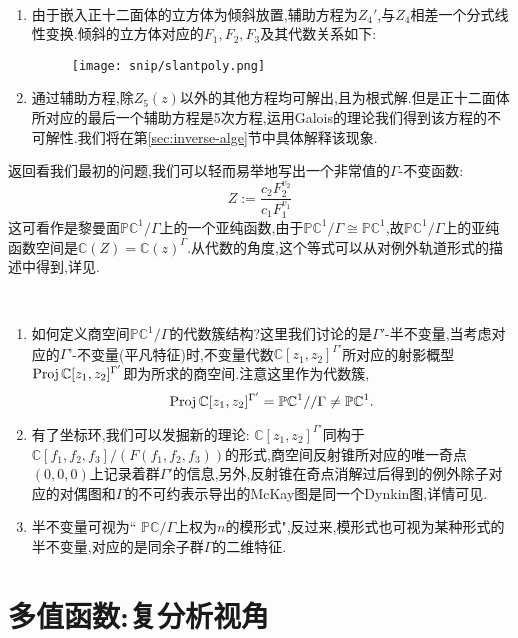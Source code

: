 \begin{remarks}\
	\begin{enumerate}[1.]
		\item 由于嵌入正十二面体的立方体为倾斜放置,辅助方程为$Z_4'$,与$Z_4$相差一个分式线性变换.倾斜的立方体对应的$F_1,F_2,F_3$及其代数关系如下:
	\begin{figure}[ht]
	\centering
	\texttt{[image: snip/slantpoly.png]}
\end{figure}
		\item 通过辅助方程,除$Z_5(z)$以外的其他方程均可解出,且为根式解.但是正十二面体所对应的最后一个辅助方程是5次方程,运用Galois的理论我们得到该方程的不可解性.我们将在第\ref{sec:inverse-alge}节中具体解释该现象.
	\end{enumerate}
\end{remarks}
返回看我们最初的问题,我们可以轻而易举地写出一个非常值的$\Gamma$-不变函数:
$$Z:= \frac{c_2F_2^{v_2}}{c_1F_1^{v_1}}$$
这可看作是黎曼面$\mathbb{PC}^1/\Gamma$上的一个亚纯函数,由于$\mathbb{PC}^1/\Gamma \cong \mathbb{PC}^1$,故$\mathbb{PC}^1/\Gamma$上的亚纯函数空间是$\mathbb{C}(Z) = \mathbb{C}(z)^{\Gamma}$.从代数的角度,这个等式可以从对例外轨道形式的描述中得到,详见\cite[3.5,3.6]{shurman1997geometry}.
\begin{remarks}\
	\begin{enumerate}
		\item 如何定义商空间$\mathbb{PC}^1/\Gamma$的代数簇结构?这里我们讨论的是$\Gamma'$-半不变量,当考虑对应的$\Gamma’$-不变量(平凡特征)时,不变量代数$\mathbb{C}[z_1,z_2]^{\Gamma'}$所对应的射影概型$\operatorname{\operatorname{Proj}}\mathbb{C}[z_1,z_2]^{\Gamma'}$即为所求的商空间.注意这里作为代数簇, $$\operatorname{\operatorname{Proj}}\mathbb{C}[z_1,z_2]^{\Gamma'} = \mathbb{PC}^1//\Gamma \neq \mathbb{PC}^1.$$
		\item  有了坐标环,我们可以发掘新的理论: $\mathbb{C}[z_1,z_2]^{\Gamma'}$同构于$\mathbb{C}[f_1,f_2,f_3]/(F(f_1,f_2,f_3))$的形式,商空间反射锥所对应的唯一奇点$(0,0,0)$上记录着群$\Gamma'$的信息,另外,反射锥在奇点消解过后得到的例外除子对应的对偶图和$\Gamma$的不可约表示导出的McKay图是同一个Dynkin图,详情可见\cite{han2018Mckay}.
		\item 半不变量可视为`` $\mathbb{PC}/\Gamma$上权为$n$的模形式",反过来,模形式也可视为某种形式的半不变量,对应的是同余子群$\Gamma$的二维特征.
	\end{enumerate}
	
\end{remarks}
\section{多值函数:复分析视角}\label{sec:inverse-comp}


